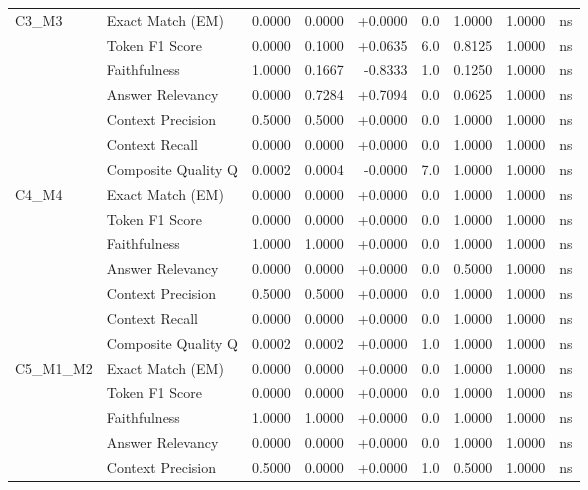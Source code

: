 \begin{table}[p]
\begin{tabular*}{\textwidth}{@{\extracolsep{\fill}} l l r r r r r r c @{}}
\addlinespace
C3\_M3          & Exact Match (EM)     & 0.0000 & 0.0000 & +0.0000 & 0.0 & 1.0000 & 1.0000 & ns \\
                & Token F1 Score       & 0.0000 & 0.1000 & +0.0635 & 6.0 & 0.8125 & 1.0000 & ns \\
                & Faithfulness         & 1.0000 & 0.1667 & -0.8333 & 1.0 & 0.1250 & 1.0000 & ns \\
                & Answer Relevancy     & 0.0000 & 0.7284 & +0.7094 & 0.0 & 0.0625 & 1.0000 & ns \\
                & Context Precision    & 0.5000 & 0.5000 & +0.0000 & 0.0 & 1.0000 & 1.0000 & ns \\
                & Context Recall       & 0.0000 & 0.0000 & +0.0000 & 0.0 & 1.0000 & 1.0000 & ns \\
                & Composite Quality Q  & 0.0002 & 0.0004 & -0.0000 & 7.0 & 1.0000 & 1.0000 & ns \\
\addlinespace
C4\_M4          & Exact Match (EM)     & 0.0000 & 0.0000 & +0.0000 & 0.0 & 1.0000 & 1.0000 & ns \\
                & Token F1 Score       & 0.0000 & 0.0000 & +0.0000 & 0.0 & 1.0000 & 1.0000 & ns \\
                & Faithfulness         & 1.0000 & 1.0000 & +0.0000 & 0.0 & 1.0000 & 1.0000 & ns \\
                & Answer Relevancy     & 0.0000 & 0.0000 & +0.0000 & 0.0 & 0.5000 & 1.0000 & ns \\
                & Context Precision    & 0.5000 & 0.5000 & +0.0000 & 0.0 & 1.0000 & 1.0000 & ns \\
                & Context Recall       & 0.0000 & 0.0000 & +0.0000 & 0.0 & 1.0000 & 1.0000 & ns \\
                & Composite Quality Q  & 0.0002 & 0.0002 & +0.0000 & 1.0 & 1.0000 & 1.0000 & ns \\
\addlinespace
C5\_M1\_M2      & Exact Match (EM)     & 0.0000 & 0.0000 & +0.0000 & 0.0 & 1.0000 & 1.0000 & ns \\
                & Token F1 Score       & 0.0000 & 0.0000 & +0.0000 & 0.0 & 1.0000 & 1.0000 & ns \\
                & Faithfulness         & 1.0000 & 1.0000 & +0.0000 & 0.0 & 1.0000 & 1.0000 & ns \\
                & Answer Relevancy     & 0.0000 & 0.0000 & +0.0000 & 0.0 & 1.0000 & 1.0000 & ns \\
                & Context Precision    & 0.5000 & 0.0000 & +0.0000 & 1.0 & 0.5000 & 1.0000 & ns \\

\end{tabular*}
\end{table}
